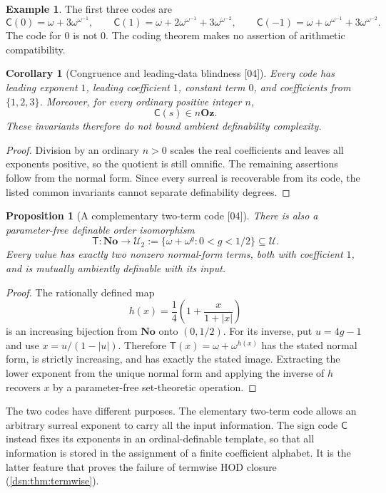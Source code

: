 \documentclass[11pt,a4paper]{article}
\numberwithin{equation}{section}
\newtheorem{proposition}[proposition]{Proposition}
\newtheorem{corollary}[corollary]{Corollary}
\theoremstyle{definition}
\newtheorem{example}[example]{Example}
\theoremstyle{remark}
\newcommand{\No}{\mathbf{No}}
\newcommand{\Oz}{\mathbf{Oz}}
\newcommand{\HOD}{\mathrm{HOD}}
\newcommand{\Code}{\mathsf C}
\newcommand{\Two}{\mathsf T}
\newcommand{\Cell}{\mathcal U}
\newcommand{\src}[1]{\textup{\textsf{\small[#1]}}}
\begin{document}
\begin{example}
The first three codes are
\[
 \Code(0)=\omega+3\omega^{\omega^{-1}},\qquad
 \Code(1)=\omega+2\omega^{\omega^{-1}}+3\omega^{\omega^{-2}},
 \qquad
 \Code(-1)=\omega+\omega^{\omega^{-1}}+3\omega^{\omega^{-2}}.
\]
The code for $0$ is not $0$. The coding theorem makes no assertion of
arithmetic compatibility.
\end{example}

\begin{corollary}[Congruence and leading-data blindness \src{04}]\label{dsn:cor:blind}
Every code has leading exponent $1$, leading coefficient $1$, constant
term $0$, and coefficients from $\{1,2,3\}$. Moreover, for every
ordinary positive integer $n$,
\[
 \Code(s)\in n\Oz.
\]
These invariants therefore do not bound ambient definability complexity.
\end{corollary}
\begin{proof}
Division by an ordinary $n>0$ scales the real coefficients and leaves
all exponents positive, so the quotient is still omnific. The remaining
assertions follow from the normal form. Since every surreal is
recoverable from its code, the listed common invariants cannot
separate definability degrees.
\end{proof}

\begin{proposition}[A complementary two-term code \src{04}]\label{dsn:prop:twotermcode}
There is also a parameter-free definable order isomorphism
\[
 \Two:\No\longrightarrow
 \Cell_2:=\{\omega+\omega^g:0<g<1/2\}\subseteq\Cell.
\]
Every value has exactly two nonzero normal-form terms, both with
coefficient $1$, and is mutually ambiently definable with its input.
\end{proposition}
\begin{proof}
The rationally defined map
\[
 h(x)=\frac14\left(1+\frac{x}{1+|x|}\right)
\]
is an increasing bijection from $\No$ onto $(0,1/2)$. For its
inverse, put $u=4g-1$ and use $x=u/(1-|u|)$. Therefore
$\Two(x)=\omega+\omega^{h(x)}$ has the stated normal form,
is strictly increasing, and has exactly the stated image. Extracting
the lower exponent from the unique normal form and applying the
inverse of $h$ recovers $x$ by a parameter-free set-theoretic
operation.
\end{proof}

The two codes have different purposes. The elementary two-term
code allows an arbitrary surreal exponent to carry all the input
information. The sign code $\Code$ instead fixes its exponents in
an ordinal-definable template, so that all information is stored in
the assignment of a finite coefficient alphabet. It is the latter
feature that proves the failure of termwise $\HOD$ closure
(\cref{dsn:thm:termwise}).
\end{document}
